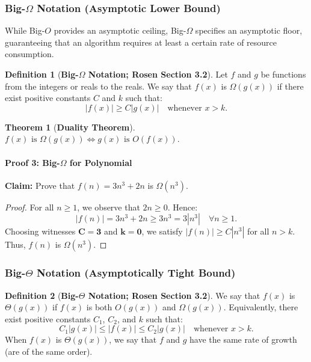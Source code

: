 \documentclass[10pt,a4paper]{article}
\theoremstyle{definition}
\newtheorem{definition}{Definition}[section]
\newtheorem{theorem}{Theorem}[section]
\begin{document}
\subsubsection{Big-$\Omega$ Notation (Asymptotic Lower Bound)}
While Big-$O$ provides an asymptotic ceiling, Big-$\Omega$ specifies an asymptotic floor, guaranteeing that an algorithm requires at least a certain rate of resource consumption.

\begin{definition}[\textbf{Big-$\Omega$ Notation; Rosen Section 3.2}]
Let $f$ and $g$ be functions from the integers or reals to the reals. We say that $f(x)$ is $\Omega(g(x))$ if there exist positive constants $C$ and $k$ such that:
\begin{equation}
|f(x)| \ge C |g(x)| \quad \text{whenever } x > k.
\end{equation}
\end{definition}

\begin{theorem}[\textbf{Duality Theorem}]
$f(x) \text{ is } \Omega(g(x)) \iff g(x) \text{ is } O(f(x))$.
\end{theorem}

\paragraph{Proof 3: Big-$\Omega$ for Polynomial}
\textbf{Claim:} Prove that $f(n) = 3n^3 + 2n$ is $\Omega(n^3)$.
\begin{proof}
For all $n \ge 1$, we observe that $2n \ge 0$. Hence:
$$|f(n)| = 3n^3 + 2n \ge 3n^3 = 3|n^3| \quad \forall n \ge 1.$$
Choosing witnesses $\mathbf{C = 3}$ and $\mathbf{k = 0}$, we satisfy $|f(n)| \ge C |n^3|$ for all $n > k$. Thus, $f(n)$ is $\Omega(n^3)$.
\end{proof}

\subsubsection{Big-$\Theta$ Notation (Asymptotically Tight Bound)}
\begin{definition}[\textbf{Big-$\Theta$ Notation; Rosen Section 3.2}]
We say that $f(x)$ is $\Theta(g(x))$ if $f(x)$ is both $O(g(x))$ and $\Omega(g(x))$. Equivalently, there exist positive constants $C_1$, $C_2$, and $k$ such that:
\begin{equation}
C_1 |g(x)| \le |f(x)| \le C_2 |g(x)| \quad \text{whenever } x > k.
\end{equation}
When $f(x)$ is $\Theta(g(x))$, we say that $f$ and $g$ have the same rate of growth (are of the same order).
\end{definition}
\end{document}
